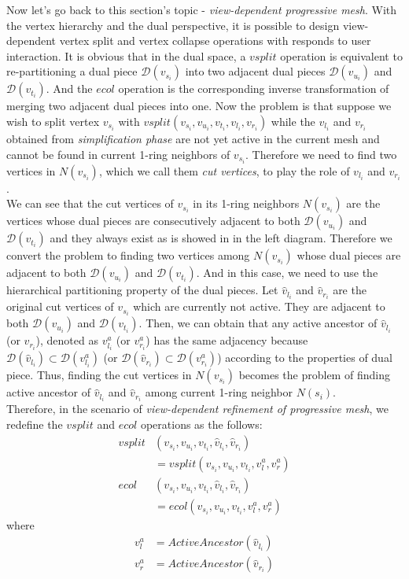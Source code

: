 Now let's go back to this section's topic - \emph{view-dependent progressive mesh}. With the vertex hierarchy and the dual perspective, it is possible to design view-dependent vertex split and vertex collapse operations with responds to user interaction. It is obvious that in the dual space, a $vsplit$ operation is equivalent to re-partitioning a dual piece $\mathcal{D}(v_{s_i})$ into two adjacent dual pieces $\mathcal{D}(v_{u_i})$ and $\mathcal{D}(v_{t_i})$. And the $ecol$ operation is the corresponding inverse transformation of merging two adjacent dual pieces into one. Now the problem is that suppose we wish to split vertex $v_{s_i}$ with $vsplit(v_{s_i}, v_{u_i},v_{t_i},v_{l_i},v_{r_i})$ while the $v_{l_i}$ and $v_{r_i}$ obtained from \emph{simplification phase} are not yet active in the current mesh and cannot be found in current 1-ring neighbors of $v_{s_i}$. Therefore we need to find two vertices in $N(v_{s_i})$, which we call them \emph{cut vertices}, to play the role of $v_{l_i}$ and $v_{r_i}$. \\

We can see that the cut vertices of $v_{s_i}$ in its 1-ring neighbors $N(v_{s_i})$ are the vertices whose dual pieces are consecutively adjacent to both $\mathcal{D}(v_{u_i})$ and $\mathcal{D}(v_{t_i})$ and they always exist as is showed in  in the left diagram. Therefore we convert the problem to finding two vertices among $N(v_{s_i})$ whose dual pieces are adjacent to both $\mathcal{D}(v_{u_i})$ and $\mathcal{D}(v_{t_i})$. And in this case, we need to use the hierarchical partitioning property of the dual pieces. Let $\hat{v}_{l_i}$ and $\hat{v}_{r_i}$ are the original cut vertices of $v_{s_i}$ which are currently not active. They are adjacent to both $\mathcal{D}(v_{u_i})$ and $\mathcal{D}(v_{t_i})$. Then, we can obtain that any active ancestor of $\hat{v}_{l_i}$ (or $\hat{v}_{r_i}$), denoted as $v^a_{l_i}$ (or $v^a_{r_i}$) has the same adjacency because $\mathcal{D}(\hat{v}_{l_i})\subset\mathcal{D}(v^a_{l_i})$ (or $\mathcal{D}(\hat{v}_{r_i})\subset\mathcal{D}(v^a_{r_i})$) according to the properties of dual piece. Thus, finding the cut vertices in $N(v_{s_i})$ becomes the problem of finding active ancestor of $\hat{v}_{l_i}$ and $\hat{v}_{r_i}$ among current 1-ring neighbor $N(s_i)$. \\

Therefore, in the scenario of \emph{view-dependent refinement of progressive mesh}, we redefine the $vsplit$ and $ecol$ operations as the follows:
\begin{align}
	vsplit & (v_{s_i},v_{u_i},v_{t_i},\hat{v}_{l_i},\hat{v}_{r_i}) \\
		 & =vsplit(v_{s_i},v_{u_i},v_{t_i},v^a_l,v^a_r)\\
	 ecol&(v_{s_i},v_{u_i},v_{t_i},\hat{v}_{l_i},\hat{v}_{r_i}) \\
	         & =ecol(v_{s_i},v_{u_i},v_{t_i},v^a_l,v^a_r)
\end{align}
where
\begin{align}
	v^a_l & =ActiveAncestor(\hat{v}_{l_i})\\
	v^a_r &=ActiveAncestor(\hat{v}_{r_i})	
\end{align}

